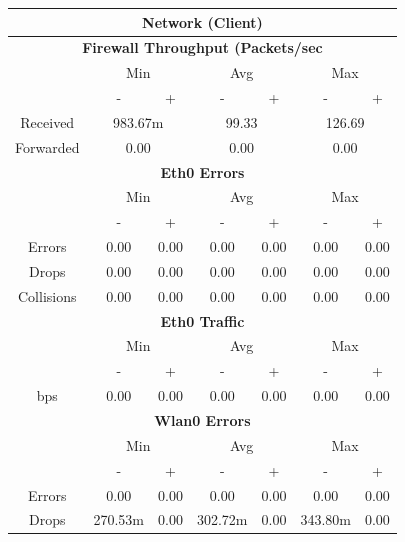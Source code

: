 \documentclass[11pt,a4paper,headinclude=false,footinclude=false]{scrreprt}
\begin{document}
\begin{table}[H]
\centering
    \begin{tabular}{||c|c|c|c|c|c|c||}
    \hline
    \multicolumn{7}{|c|}{\textbf{Network (Client)}} \\
    \hline
    \multicolumn{7}{|c|}{\textbf{Firewall Throughput (Packets/sec}} \\
    \hline\hline
      & \multicolumn{2}{|c|}{Min} & \multicolumn{2}{|c|}{Avg} & \multicolumn{2}{|c|}{Max} \\
    \hline\hline
      & - & + & - & + & - & + \\
    \hline
    Received & \multicolumn{2}{|c|}{983.67m} & \multicolumn{2}{|c|}{99.33} & \multicolumn{2}{|c|}{126.69} \\
    \hline
    Forwarded & \multicolumn{2}{|c|}{0.00} & \multicolumn{2}{|c|}{0.00} & \multicolumn{2}{|c|}{0.00} \\
    \hline\hline
    \multicolumn{7}{|c|}{\textbf{Eth0 Errors}} \\
    \hline\hline
      & \multicolumn{2}{|c|}{Min} & \multicolumn{2}{|c|}{Avg} & \multicolumn{2}{|c|}{Max} \\
    \hline
     & - & + & - & + & - & + \\
    \hline
    Errors & 0.00 & 0.00 & 0.00 & 0.00 & 0.00 & 0.00 \\
    \hline
    Drops & 0.00 & 0.00 & 0.00 & 0.00 & 0.00 & 0.00 \\
    \hline
    Collisions & 0.00 & 0.00 & 0.00 & 0.00 & 0.00 & 0.00 \\
    \hline\hline
    \multicolumn{7}{|c|}{\textbf{Eth0 Traffic}} \\
    \hline\hline
      & \multicolumn{2}{|c|}{Min} & \multicolumn{2}{|c|}{Avg} & \multicolumn{2}{|c|}{Max} \\
    \hline
      & - & + & - & + & - & + \\
    \hline
    bps & 0.00 & 0.00 & 0.00 & 0.00 & 0.00 & 0.00 \\
    \hline\hline
    \multicolumn{7}{|c|}{\textbf{Wlan0 Errors}} \\
    \hline\hline
      & \multicolumn{2}{|c|}{Min} & \multicolumn{2}{|c|}{Avg} & \multicolumn{2}{|c|}{Max} \\
    \hline
      & - & + & - & + & - & + \\
    \hline
    Errors  & 0.00 & 0.00 & 0.00 & 0.00 & 0.00 & 0.00 \\
    \hline
    Drops & 270.53m & 0.00 & 302.72m & 0.00 & 343.80m & 0.00 \\

\end{tabular}
\end{table}
\end{document}
